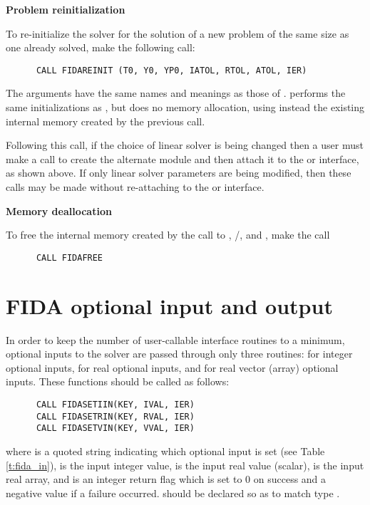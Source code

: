 \begin{Steps}
\item {\bf Problem reinitialization}

  To re-initialize the {\ida} solver for the solution of a new problem
  of the same size as one already solved, make the following call:
\begin{verbatim}
      CALL FIDAREINIT (T0, Y0, YP0, IATOL, RTOL, ATOL, IER)
\end{verbatim}
  The arguments have the same names and meanings as those of .
   performs the same initializations as , but
  does no memory allocation, using instead the existing internal memory
  created by the previous  call.

  Following this call, if the choice of linear solver is being changed
  then a user must make a call to create the alternate {\sunlinsol}
  module and then attach it to the {\idadls} or {\idaspils} interface,
  as shown above.  If only linear solver parameters are being modified,
  then these calls may be made without re-attaching to the {\idadls} or
  {\idaspils} interface.


\item {\bf Memory deallocation}

  To free the internal memory created by the call to ,
  /,  and
  ,
  make the call
\begin{verbatim}
      CALL FIDAFREE
\end{verbatim}

\end{Steps}

\section{FIDA optional input and output}\label{fida_opt_inout}

In order to keep the number of user-callable {\fida} interface routines to
a minimum, optional inputs to the {\ida} solver are passed through only
three routines:  for integer optional inputs, 
for real optional inputs, and  for real vector (array) optional
inputs.  These functions should be called as follows:
\begin{verbatim}
      CALL FIDASETIIN(KEY, IVAL, IER)
      CALL FIDASETRIN(KEY, RVAL, IER)
      CALL FIDASETVIN(KEY, VVAL, IER)
\end{verbatim}
where  is a quoted string indicating which optional input is set
(see Table \ref{t:fida_in}),  is the input integer value,
 is the input real value (scalar),
 is the input real array, and
 is an integer return flag which is set to $0$ on success and
a negative value if a failure occurred.
 should be declared so as to match {\CC} type .

